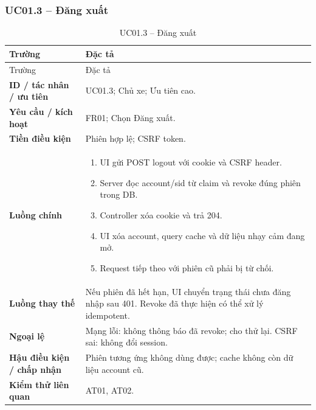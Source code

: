 \subsubsection{UC01.3 -- Đăng xuất}\label{uc:UC01.3}
\begin{smalltable}\begin{longtable}{L{3.2cm}L{11.8cm}}
\caption{UC01.3 -- Đăng xuất}\label{tab:UC01.3}\\
\toprule Trường & Đặc tả\\\midrule\endfirsthead
\toprule Trường & Đặc tả\\\midrule\endhead
\textbf{ID / tác nhân / ưu tiên} & UC01.3; Chủ xe; Ưu tiên cao.\\
\textbf{Yêu cầu / kích hoạt} & FR01; Chọn Đăng xuất.\\
\textbf{Tiền điều kiện} & Phiên hợp lệ; CSRF token.\\
\textbf{Luồng chính} & \begin{enumerate}[leftmargin=*,nosep]
\item UI gửi POST logout với cookie và CSRF header.
\item Server đọc account/sid từ claim và revoke đúng phiên trong DB.
\item Controller xóa cookie và trả 204.
\item UI xóa account, query cache và dữ liệu nhạy cảm đang mở.
\item Request tiếp theo với phiên cũ phải bị từ chối.
\end{enumerate}\\
\textbf{Luồng thay thế} & Nếu phiên đã hết hạn, UI chuyển trạng thái chưa đăng nhập sau 401. Revoke đã thực hiện có thể xử lý idempotent.\\
\textbf{Ngoại lệ} & Mạng lỗi: không thông báo đã revoke; cho thử lại. CSRF sai: không đổi session.\\
\textbf{Hậu điều kiện / chấp nhận} & Phiên tương ứng không dùng được; cache không còn dữ liệu account cũ.\\
\textbf{Kiểm thử liên quan} & AT01, AT02.\\
\bottomrule\end{longtable}\end{smalltable}
